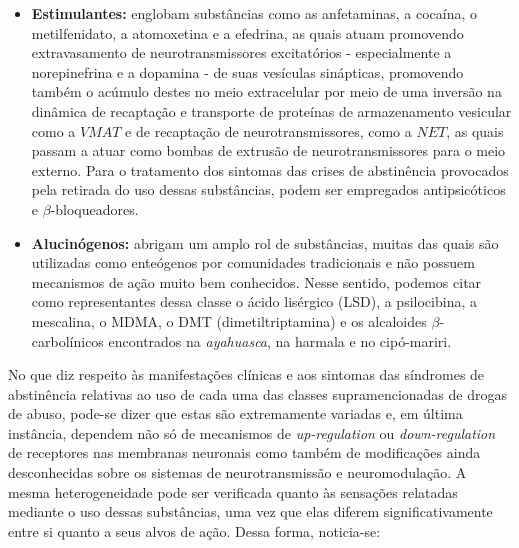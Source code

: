 \documentclass[
]{book}
\begin{document}
\begin{itemize}
\item
  \textbf{Estimulantes:} englobam substâncias como as anfetaminas, a cocaína, o metilfenidato, a atomoxetina e a efedrina, as quais atuam promovendo extravasamento de neurotransmissores excitatórios - especialmente a norepinefrina e a dopamina - de suas vesículas sinápticas, promovendo também o acúmulo destes no meio extracelular por meio de uma inversão na dinâmica de recaptação e transporte de proteínas de armazenamento vesicular como a \(VMAT\) e de recaptação de neurotransmissores, como a \(NET\), as quais passam a atuar como bombas de extrusão de neurotransmissores para o meio externo. Para o tratamento dos sintomas das crises de abstinência provocados pela retirada do uso dessas substâncias, podem ser empregados antipsicóticos e \(\beta\)-bloqueadores.
\item
  \textbf{Alucinógenos:} abrigam um amplo rol de substâncias, muitas das quais são utilizadas como enteógenos por comunidades tradicionais e não possuem mecanismos de ação muito bem conhecidos. Nesse sentido, podemos citar como representantes dessa classe o ácido lisérgico (LSD), a psilocibina, a mescalina, o MDMA, o DMT (dimetiltriptamina) e os alcaloides \(\beta\)-carbolínicos encontrados na \emph{ayahuasca}, na harmala e no cipó-mariri.
\end{itemize}

No que diz respeito às manifestações clínicas e aos sintomas das síndromes de abstinência relativas ao uso de cada uma das classes supramencionadas de drogas de abuso, pode-se dizer que estas são extremamente variadas e, em última instância, dependem não só de mecanismos de \emph{up-regulation} ou \emph{down-regulation} de receptores nas membranas neuronais como também de modificações ainda desconhecidas sobre os sistemas de neurotransmissão e neuromodulação. A mesma heterogeneidade pode ser verificada quanto às sensações relatadas mediante o uso dessas substâncias, uma vez que elas diferem significativamente entre si quanto a seus alvos de ação. Dessa forma, noticia-se:
\end{document}
